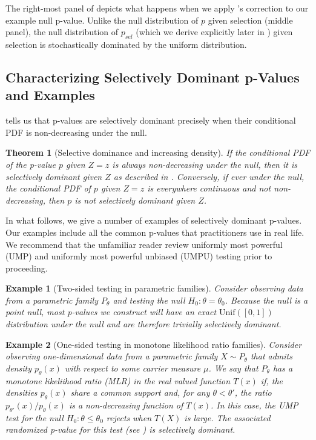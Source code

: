 \documentclass{article}
\newtheorem{example}{Example}
\newtheorem{theorem}{Theorem}
\begin{document}
The right-most panel of  depicts what happens when we apply 's correction to our example null p-value. Unlike the null distribution of $p$ given selection (middle panel), the null distribution of $p_{sel}$ (which we derive explicitly later in ) given selection is stochastically dominated by the uniform distribution. 

\subsection{Characterizing Selectively Dominant p-Values and Examples}

 tells us that p-values are selectively dominant precisely when their conditional PDF is non-decreasing under the null. 

\begin{theorem}[Selective dominance and increasing density]
    \label{thm:density}
    If the conditional PDF of the p-value $p$ given $Z=z$ is always non-decreasing under the null, then it is selectively dominant given $Z$ as described in . Conversely, if ever under the null, the conditional PDF of $p$ given $Z=z$ is everywhere continuous and not non-decreasing, then $p$ is not selectively dominant given $Z$.  
\end{theorem}

In what follows, we give a number of examples of selectively dominant p-values. Our examples include all the common p-values that practitioners use in real life. We recommend that the unfamiliar reader review uniformly most powerful (UMP) and uniformly most powerful unbiased (UMPU) testing \cite[Chapter 3 and Chapter 4]{Lehmann} prior to proceeding.

\begin{example}[Two-sided testing in parametric families]
\label{exm:two-sided}
Consider observing data from a parametric family $P_{\theta}$ and testing the null $H_0 : \theta = \theta_0$. Because the null is a point null, most p-values we construct will have an exact $\text{Unif}([0, 1])$ distribution under the null and are therefore trivially selectively dominant. 
\end{example}

\begin{example}[One-sided testing in monotone likelihood ratio families]
\label{exm:mlr}
Consider observing one-dimensional data from a parametric family $X \sim P_{\theta}$ that admits density $p_{\theta}(x)$ with respect to some carrier measure $\mu$. We say that $P_{\theta}$ has a monotone likeliihood ratio (MLR) in the real valued function $T(x)$ if, the densities $p_{\theta}(x)$ share a common support and, for any $\theta < \theta'$, the ratio $p_{\theta'}(x)/p_{\theta}(x)$ is a non-decreasing function of $T(x)$. In this case, the UMP test for the null $H_0: \theta \leq \theta_0$ rejects when $T(X)$ is large. The associated randomized p-value for this test (see ) is selectively dominant. 
\end{example}
\end{document}
